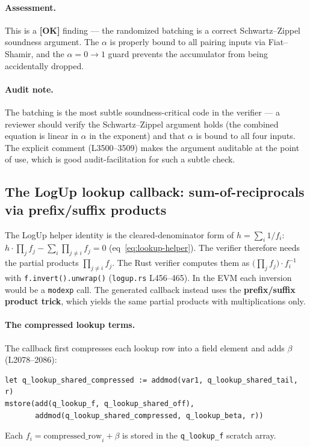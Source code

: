 \paragraph{Assessment.} This is a
\textcolor{tracegreen}{\textbf{[OK]}} finding --- the randomized
batching is a correct Schwartz--Zippel soundness argument. The
$\alpha$ is properly bound to all pairing inputs via
Fiat--Shamir, and the $\alpha = 0 \to 1$ guard prevents the
accumulator from being accidentally dropped.

\paragraph{Audit note.} The batching is the most subtle
soundness-critical code in the verifier --- a reviewer should
verify the Schwartz--Zippel argument holds (the combined
equation is linear in $\alpha$ in the exponent) and that $\alpha$ is
bound to all four inputs. The explicit comment (L3500--3509)
makes the argument auditable at the point of use, which is good
audit-facilitation for such a subtle check.

\subsection{The LogUp lookup callback: sum-of-reciprocals via prefix/suffix products}
\label{sec:pr-logup}

The LogUp helper identity is the cleared-denominator form of
$h = \sum_i 1/f_i$:
$h\cdot\prod_j f_j - \sum_i \prod_{j\ne i} f_j = 0$
(eq~\eqref{eq:lookup-helper}). The verifier therefore needs the
partial products $\prod_{j\ne i} f_j$. The Rust verifier computes
them as $\bigl(\prod_j f_j\bigr)\cdot f_i^{-1}$ with
\texttt{f.invert().unwrap()} (\texttt{logup.rs} L456--465). In the
EVM each inversion would be a \texttt{modexp} call. The generated
callback instead uses the \textbf{prefix/suffix product trick},
which yields the same partial products with multiplications only.

\paragraph{The compressed lookup terms.} The callback first
compresses each lookup row into a field element and adds
$\beta$ (L2078--2086):
\begin{lstlisting}[style=yul]
let q_lookup_shared_compressed := addmod(var1, q_lookup_shared_tail, r)
mstore(add(q_lookup_f, q_lookup_shared_off),
       addmod(q_lookup_shared_compressed, q_lookup_beta, r))
\end{lstlisting}
Each $f_i = \text{compressed\_row}_i + \beta$ is stored in the
\texttt{q\_lookup\_f} scratch array.

